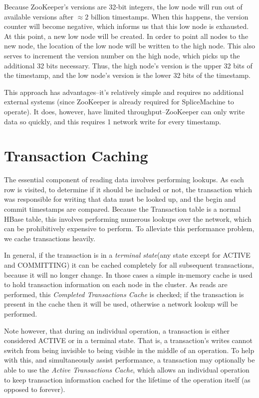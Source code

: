 Because ZooKeeper's versions are 32-bit integers, the low node will run out of available versions after $\approx 2$ billion timestamps. When this happens, the version counter will become negative, which informs us that this low node is exhausted. At this point, a new low node will be created. In order to point all nodes to the new node, the location of the low node will be written to the high node. This also serves to increment the version number on the high node, which picks up the additional 32 bits necessary. Thus, the high node's version is the upper 32 bits of the timestamp, and the low node's version is the lower 32 bits of the timestamp.

This approach has advantages--it's relatively simple and requires no additional external systems (since ZooKeeper is already required for SpliceMachine to operate). It does, however, have limited throughput--ZooKeeper can only write data so quickly, and this requires 1 network write for every timestamp. 

\section{Transaction Caching}
The essential component of reading data involves performing lookups. As each row is visited, to determine if it should be included or not, the transaction which was responsible for writing that data must be looked up, and the begin and commit timestamps are compared. Because the Transaction table is a normal HBase table, this involves performing numerous lookups over the network, which can be prohibitively expensive to perform. To alleviate this performance problem, we cache transactions heavily.

In general, if the transaction is in a \emph{terminal state}(any state except for ACTIVE and COMMITTING) it can be cached completely for all subsequent transactions, because it will no longer change. In those cases a simple in-memory cache is used to hold transaction information on each node in the cluster. As reads are performed, this \emph{Completed Transactions Cache} is checked; if the transaction is present in the cache then it will be used, otherwise a network lookup will be performed.

Note however, that during an individual operation, a transaction is either considered ACTIVE or in a terminal state. That is, a transaction's writes cannot switch from being invisible to being visible in the middle of an operation. To help with this, and simultaneously assist performance, a transaction may optionally be able to use the \emph{Active Transactions Cache}, which allows an individual operation to keep transaction information cached for the lifetime of the operation itself (as opposed to forever).

